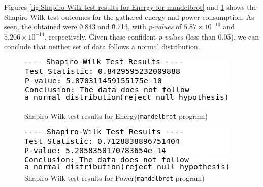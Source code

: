 Figures \ref{fig:Shapiro-Wilk test results for Energy for mandelbrot} and \ref{fig:Shapiro-Wilk test results for Power for mandelbrot} shows the Shapiro-Wilk test outcomes for the gathered energy and power consumption.
As seen, 
the obtained were \~0.843 and \~0.713, with \textit{p-values} of \(5.87 \times 10^{-10}\) and \(5.206 \times 10^{-14}\), respectively. Given these confident \textit{p-values} (less than 0.05), we can conclude that neither set of data follows a normal distribution.


\begin{figure}[htbp]
  \centering
  \begin{minipage}[b]{.49\textwidth}
    \includegraphics[width=1\linewidth]{img/mandelbrot_shapiro_test_energy_update.png}
    \caption{Shapiro-Wilk test results for Energy(\texttt{mandelbrot} program)}
    \label{fig:Shapiro-Wilk test results for Energy for mandelbrot}
  \end{minipage}
  \hfill
  \begin{minipage}[b]{0.49\textwidth}
    \includegraphics[width=1\linewidth]{img/mandelbrot_shapiro_test_power_update.png}
    \caption{Shapiro-Wilk test results for Power(\texttt{mandelbrot} program)}
    \label{fig:Shapiro-Wilk test results for Power for mandelbrot}
  \end{minipage}
\end{figure}
\vspace{-8pt}


